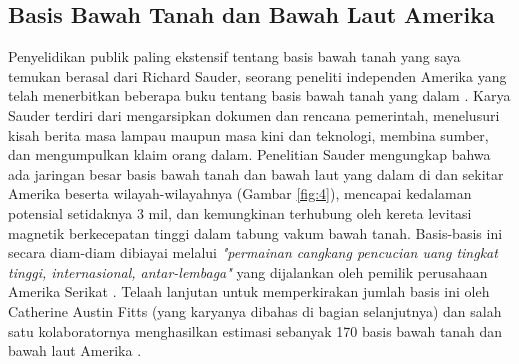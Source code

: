 \documentclass[10pt,twocolumn,letterpaper]{article}
\begin{document}
\subsection{Basis Bawah Tanah dan Bawah Laut Amerika}

Penyelidikan publik paling ekstensif tentang basis bawah tanah yang saya temukan berasal dari Richard Sauder, seorang peneliti independen Amerika yang telah menerbitkan beberapa buku tentang basis bawah tanah yang dalam \cite{22}. Karya Sauder terdiri dari mengarsipkan dokumen dan rencana pemerintah, menelusuri kisah berita masa lampau maupun masa kini dan teknologi, membina sumber, dan mengumpulkan klaim orang dalam. Penelitian Sauder mengungkap bahwa ada jaringan besar basis bawah tanah dan bawah laut yang dalam di dan sekitar Amerika beserta wilayah-wilayahnya (Gambar \ref{fig:4}), mencapai kedalaman potensial setidaknya 3 mil, dan kemungkinan terhubung oleh kereta levitasi magnetik berkecepatan tinggi dalam tabung vakum bawah tanah. Basis-basis ini secara diam-diam dibiayai melalui \textit{"permainan cangkang pencucian uang tingkat tinggi, internasional, antar-lembaga"} yang dijalankan oleh pemilik perusahaan Amerika Serikat \cite{22}. Telaah lanjutan untuk memperkirakan jumlah basis ini oleh Catherine Austin Fitts (yang karyanya dibahas di bagian selanjutnya) dan salah satu kolaboratornya menghasilkan estimasi sebanyak 170 basis bawah tanah dan bawah laut Amerika \cite{16,20}.
\end{document}
